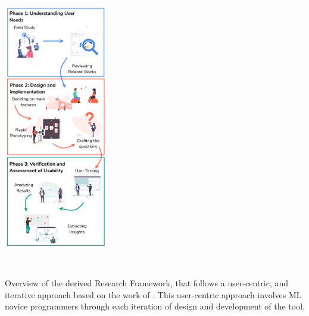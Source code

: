 \documentclass{sigchi-ext}
\begin{document}
\begin{marginfigure}[-2pc]
\begin{minipage}{\marginparwidth}
     \centering
    \includegraphics[width=4.5cm,height=12.5cm]{figures/Method-strip.png}
    \caption{Overview of the derived Research Framework, that follows a user-centric, and iterative approach based on the work of \protect\cite{nodalo2019building}. This user-centric approach involves ML novice programmers through each iteration of design and development of the tool.}
    \label{fig:methodology}
    \end{minipage}
\end{marginfigure}
\end{document}
